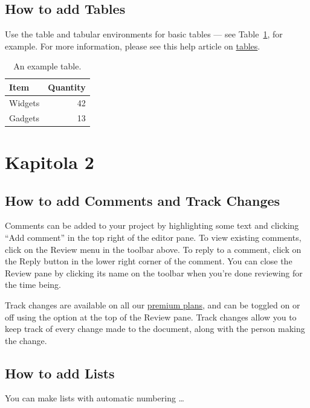 \documentclass{article}
\begin{document}
\subsection{How to add Tables}

Use the table and tabular environments for basic tables --- see Table~\ref{tab:widgets}, for example. For more information, please see this help article on \href{https://www.overleaf.com/learn/latex/tables}{tables}.

\begin{table}
      \centering
      \begin{tabular}{l|r}
            Item    & Quantity \\\hline
            Widgets & 42       \\
            Gadgets & 13
      \end{tabular}
      \caption{\label{tab:widgets}An example table.}
\end{table}

\section{Kapitola 2}

\subsection{How to add Comments and Track Changes}

Comments can be added to your project by highlighting some text and clicking ``Add comment'' in the top right of the editor pane. To view existing comments, click on the Review menu in the toolbar above. To reply to a comment, click on the Reply button in the lower right corner of the comment. You can close the Review pane by clicking its name on the toolbar when you're done reviewing for the time being.

Track changes are available on all our \href{https://www.overleaf.com/user/subscription/plans}{premium plans}, and can be toggled on or off using the option at the top of the Review pane. Track changes allow you to keep track of every change made to the document, along with the person making the change.

\subsection{How to add Lists}

You can make lists with automatic numbering \dots
\end{document}
